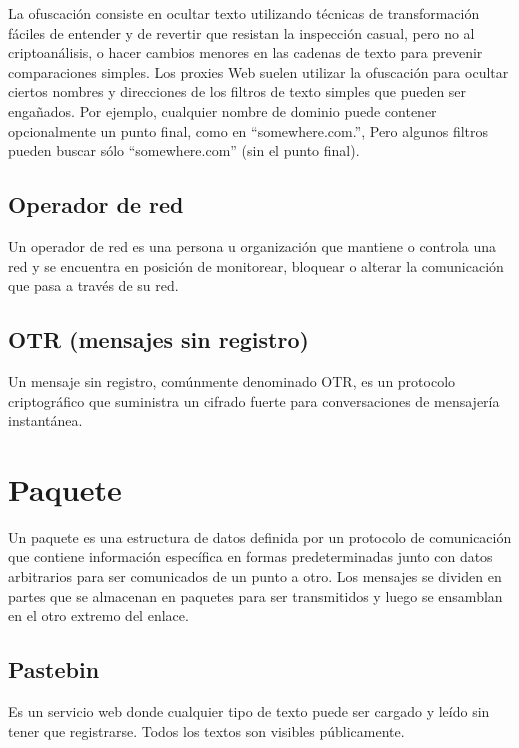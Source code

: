 La ofuscación consiste en ocultar texto utilizando técnicas de
transformación fáciles de entender y de revertir que resistan la
inspección casual, pero no al criptoanálisis, o hacer cambios menores en
las cadenas de texto para prevenir comparaciones simples. Los proxies
Web suelen utilizar la ofuscación para ocultar ciertos nombres y
direcciones de los filtros de texto simples que pueden ser engañados.
Por ejemplo, cualquier nombre de dominio puede contener opcionalmente un
punto final, como en ``somewhere.com.'', Pero algunos filtros pueden
buscar sólo ``somewhere.com'' (sin el punto final).

\subsection{Operador de red}\label{operador-de-red}

Un operador de red es una persona u organización que mantiene o controla
una red y se encuentra en posición de monitorear, bloquear o alterar la
comunicación que pasa a través de su red.

\subsection{OTR (mensajes sin
registro)}\label{otr-mensajes-sin-registro}

Un mensaje sin registro, comúnmente denominado OTR, es un protocolo
criptográfico que suministra un cifrado fuerte para conversaciones de
mensajería instantánea.

\section{Paquete}\label{paquete}

Un paquete es una estructura de datos definida por un protocolo de
comunicación que contiene información específica en formas
predeterminadas junto con datos arbitrarios para ser comunicados de un
punto a otro. Los mensajes se dividen en partes que se almacenan en
paquetes para ser transmitidos y luego se ensamblan en el otro extremo
del enlace.

\subsection{Pastebin}\label{pastebin}

Es un servicio web donde cualquier tipo de texto puede ser cargado y
leído sin tener que registrarse. Todos los textos son visibles
públicamente.

